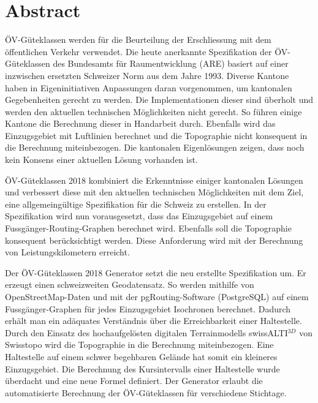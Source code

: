 
\chapter*{Abstract}
ÖV-Güteklassen werden für die Beurteilung der Erschliessung mit dem öffentlichen Verkehr verwendet.
Die heute anerkannte Spezifikation der ÖV-Güteklassen des Bundesamts für Raumentwicklung (ARE)  basiert auf einer inzwischen ersetzten Schweizer Norm aus dem Jahre 1993.
Diverse Kantone haben in Eigeninitiativen Anpassungen daran vorgenommen, um kantonalen Gegebenheiten gerecht zu werden.
Die Implementationen dieser sind überholt und werden den aktuellen technischen Möglichkeiten nicht gerecht.
So führen einige Kantone die Berechnung dieser in Handarbeit durch.
Ebenfalls wird das Einzugsgebiet mit Luftlinien berechnet und die Topographie nicht konsequent in die Berechnung miteinbezogen.
Die kantonalen Eigenlösungen zeigen, dass noch kein Konsens einer aktuellen Lösung vorhanden ist.

ÖV-Güteklassen 2018 kombiniert die Erkenntnisse einiger kantonalen Lösungen und verbessert diese mit den aktuellen technischen Möglichkeiten mit dem Ziel, eine allgemeingültige Spezifikation für die Schweiz zu erstellen.
In der Spezifikation wird nun vorausgesetzt, dass das Einzugsgebiet auf einem Fussgänger-Routing-Graphen berechnet wird.
Ebenfalls soll die Topographie konsequent berücksichtigt werden.
Diese Anforderung wird mit der Berechnung von Leistungskilometern erreicht.

Der ÖV-Güteklassen 2018 Generator setzt die neu erstellte Spezifikation um.
Er erzeugt einen schweizweiten Geodatensatz.
So werden mithilfe von OpenStreetMap-Daten und mit der pgRouting-Software (PostgreSQL) auf einem Fussgänger-Graphen für jedes Einzugsgebiet Isochronen berechnet.
Dadurch erhält man ein adäquates Verständnis über die Erreichbarkeit einer Haltestelle.
Durch den Einsatz des hochaufgelösten digitalen Terrainmodells swissALTI$^{3D}$ von Swisstopo wird die Topographie in die Berechnung miteinbezogen.
Eine Haltestelle auf einem schwer begehbaren Gelände hat somit ein kleineres Einzugsgebiet.
Die Berechnung des Kursintervalls einer Haltestelle wurde überdacht und eine neue Formel definiert.
Der Generator erlaubt die automatisierte Berechnung der ÖV-Güteklassen für verschiedene Stichtage.

